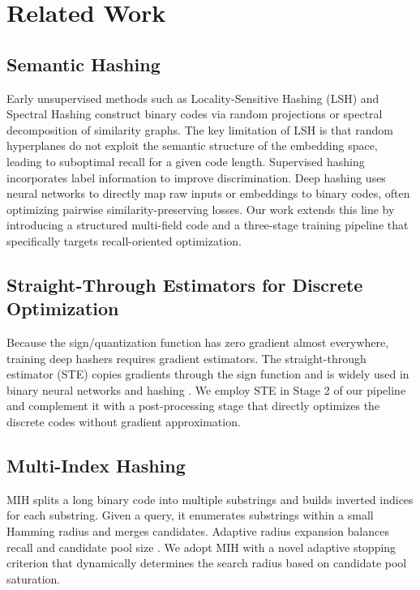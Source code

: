 \documentclass[11pt,a4paper]{article}
\begin{document}
\section{Related Work}

\subsection{Semantic Hashing}

Early unsupervised methods such as Locality-Sensitive Hashing (LSH) \citep{datar2004locality} and Spectral Hashing \citep{weiss2009spectral} construct binary codes via random projections or spectral decomposition of similarity graphs. The key limitation of LSH is that random hyperplanes do not exploit the semantic structure of the embedding space, leading to suboptimal recall for a given code length. Supervised hashing \citep{liu2012supervised,shen2015supervised} incorporates label information to improve discrimination. Deep hashing \citep{xia2014supervised,cao2015deep} uses neural networks to directly map raw inputs or embeddings to binary codes, often optimizing pairwise similarity-preserving losses. Our work extends this line by introducing a structured multi-field code and a three-stage training pipeline that specifically targets recall-oriented optimization.

\subsection{Straight-Through Estimators for Discrete Optimization}

Because the sign/quantization function has zero gradient almost everywhere, training deep hashers requires gradient estimators. The straight-through estimator (STE) \citep{bengio2013estimating} copies gradients through the sign function and is widely used in binary neural networks and hashing \citep{courbariaux2016binarized}. We employ STE in Stage 2 of our pipeline and complement it with a post-processing stage that directly optimizes the discrete codes without gradient approximation.

\subsection{Multi-Index Hashing}

MIH \citep{norouzi2012fast} splits a long binary code into multiple substrings and builds inverted indices for each substring. Given a query, it enumerates substrings within a small Hamming radius and merges candidates. Adaptive radius expansion balances recall and candidate pool size \citep{wang2018survey}. We adopt MIH with a novel adaptive stopping criterion that dynamically determines the search radius based on candidate pool saturation.
\end{document}
